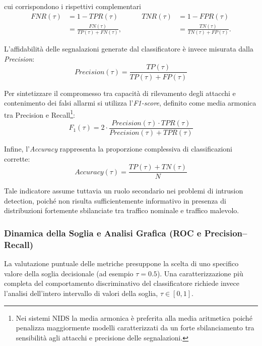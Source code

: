 cui corrispondono i rispettivi complementari
\begin{equation}
\begin{aligned}
    FNR(\tau) &= 1-TPR(\tau) \\
              &= \frac{FN(\tau)}{TP(\tau)+FN(\tau)},
\end{aligned}
\qquad
\begin{aligned}
    TNR(\tau) &= 1-FPR(\tau) \\
              &= \frac{TN(\tau)}{TN(\tau)+FP(\tau)}.
\end{aligned}
\end{equation}

L'affidabilità delle segnalazioni generate dal classificatore è invece misurata dalla \textit{Precision}:
\begin{equation}
    Precision(\tau)=\frac{TP(\tau)}{TP(\tau)+FP(\tau)}
\end{equation}

Per sintetizzare il compromesso tra capacità di rilevamento degli attacchi e contenimento dei falsi allarmi si utilizza l'\textit{F1-score}, definito come media armonica tra Precision e Recall\footnote{Nei sistemi NIDS la media armonica è preferita alla media aritmetica poiché penalizza maggiormente modelli caratterizzati da un forte sbilanciamento tra sensibilità agli attacchi e precisione delle segnalazioni.}:
\begin{equation}
    F_1(\tau)=2\cdot\frac{Precision(\tau)\cdot TPR(\tau)}{Precision(\tau)+TPR(\tau)}
\end{equation}

Infine, l'\textit{Accuracy} rappresenta la proporzione complessiva di classificazioni corrette:
\begin{equation}
    Accuracy(\tau)=\frac{TP(\tau)+TN(\tau)}{N}
\end{equation}

Tale indicatore assume tuttavia un ruolo secondario nei problemi di intrusion detection, poiché non risulta sufficientemente informativo in presenza di distribuzioni fortemente sbilanciate tra traffico nominale e traffico malevolo.

\subsubsection{Dinamica della Soglia e Analisi Grafica (ROC e Precision--Recall)}
\label{subsubsec:analisi_grafica}

La valutazione puntuale delle metriche presuppone la scelta di uno specifico valore della soglia decisionale (ad esempio $\tau=0.5$). Una caratterizzazione più completa del comportamento discriminativo del classificatore richiede invece l'analisi dell'intero intervallo di valori della soglia, $\tau\in[0,1]$.

